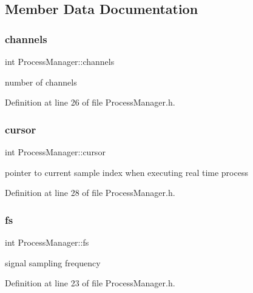 \subsection{Member Data Documentation}
\mbox{\label{class_process_manager_a325109138cabf342e5beacf7af67480b}} 
\subsubsection{\texorpdfstring{channels}{channels}}
{\footnotesize\ttfamily int Process\+Manager\+::channels}

number of channels 

Definition at line 26 of file Process\+Manager.\+h.

\mbox{\label{class_process_manager_a337af1b32b2f6bf94ed98ef98e6d1226}} 
\subsubsection{\texorpdfstring{cursor}{cursor}}
{\footnotesize\ttfamily int Process\+Manager\+::cursor}

pointer to current sample index when executing real time process 

Definition at line 28 of file Process\+Manager.\+h.

\mbox{\label{class_process_manager_ae7ce9ead957c4f78d74206baf1837a59}} 
\subsubsection{\texorpdfstring{fs}{fs}}
{\footnotesize\ttfamily int Process\+Manager\+::fs}

signal sampling frequency 

Definition at line 23 of file Process\+Manager.\+h.

\mbox{\label{class_process_manager_aafb2937f6a2f261b1581917ba872ba9b}} 

